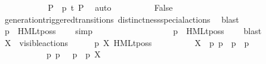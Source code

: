 \begin{isabellebody}
\ \ \ \ \ \ \ \ \isamarkupfalse%
\ \isamarkupfalse%
\ P{\isacharprime}{\kern0pt}\ \ {\isacartoucheopen}{\isasymtheta}{\isacharparenleft}{\kern0pt}p{\isacharparenright}{\kern0pt}\ {\isasymlongmapsto}\isactrlsup {\isasymtheta}t{\isacharunderscore}{\kern0pt}{\isasymepsilon}\ P{\isacharprime}{\kern0pt}{\isacartoucheclose}\ \isamarkupfalse%
\ auto\isanewline
\ \ \ \ \ \ \ \ \isamarkupfalse%
\ False\ \isamarkupfalse%
\ generation{\isacharunderscore}{\kern0pt}triggered{\isacharunderscore}{\kern0pt}transitions\ distinctness{\isacharunderscore}{\kern0pt}special{\isacharunderscore}{\kern0pt}actions\ \isamarkupfalse%
\ blast\isanewline
\ \ \ \ \ \ \ \ \isamarkupfalse%
\ {\isacartoucheopen}p\ {\isasymTTurnstile}\ HMLt{\isacharunderscore}{\kern0pt}poss\ {\isasymalpha}\ {\isasymphi}{\isacartoucheclose}\ \isamarkupfalse%
\ simp\isanewline
\ \ \ \ \ \ \isamarkupfalse%
\isanewline
\ \ \ \ \isamarkupfalse%
\isanewline
\ \ \ \ \isamarkupfalse%
\ \isamarkupfalse%
\ {\isacartoucheopen}p\ {\isasymTTurnstile}\ HMLt{\isacharunderscore}{\kern0pt}poss\ {\isasymalpha}\ {\isasymphi}{\isacartoucheclose}\ \isamarkupfalse%
\ blast\isanewline
\ \ \isamarkupfalse%
\isanewline
\ \ \ \ \isamarkupfalse%
\ {\isacartoucheopen}X\ {\isasymsubseteq}\ visible{\isacharunderscore}{\kern0pt}actions{\isacartoucheclose}\isanewline
\ \ \ \ \isamarkupfalse%
\ {\isacartoucheopen}p\ {\isasymTTurnstile}{\isacharbrackleft}{\kern0pt}X{\isacharbrackright}{\kern0pt}\ HMLt{\isacharunderscore}{\kern0pt}poss\ {\isasymalpha}\ {\isasymphi}{\isacartoucheclose}\isanewline
\ \ \ \ \isamarkupfalse%
\ {\isacartoucheopen}{\isasymalpha}\ {\isasymin}\ X\ {\isasymand}\ {\isacharparenleft}{\kern0pt}{\isasymexists}p{\isacharprime}{\kern0pt}{\isachardot}{\kern0pt}\ p\ {\isasymlongmapsto}{\isasymalpha}\ p{\isacharprime}{\kern0pt}\ {\isasymand}\ p{\isacharprime}{\kern0pt}\ {\isasymTTurnstile}\ {\isasymphi}{\isacharparenright}{\kern0pt}\ \isanewline
\ \ \ \ \ \ {\isasymor}\ {\isasymalpha}\ {\isacharequal}{\kern0pt}\ {\isasymtau}\ {\isasymand}\ {\isacharparenleft}{\kern0pt}{\isasymexists}p{\isacharprime}{\kern0pt}{\isachardot}{\kern0pt}\ p\ {\isasymlongmapsto}{\isasymtau}\ \ p{\isacharprime}{\kern0pt}\ {\isasymand}\ p{\isacharprime}{\kern0pt}\ {\isasymTTurnstile}{\isacharbrackleft}{\kern0pt}X{\isacharbrackright}{\kern0pt}\ {\isasymphi}{\isacharparenright}{\kern0pt}\ \isanewline

\end{isabellebody}
